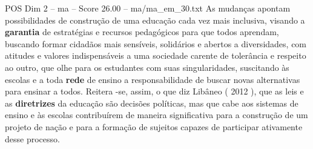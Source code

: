 \begin{textsample}{POS Dim 2 – ma – Score 26.00 – ma/ma\_em\_30.txt}
As mudanças apontam possibilidades de construção de uma educação cada vez mais inclusiva, visando a \textbf{garantia} de estratégias e recursos pedagógicos para que todos aprendam, buscando formar cidadãos mais sensíveis, solidários e abertos a diversidades, com atitudes e valores indispensáveis a uma sociedade carente de tolerância e respeito ao outro, que olhe para os estudantes com suas singularidades, suscitando às escolas e a toda \textbf{rede} de ensino a responsabilidade de buscar novas alternativas para ensinar a todos.
Reitera -se, assim, o que diz Libâneo ( 2012 ), que as leis e as \textbf{diretrizes} da educação são decisões políticas, mas que cabe aos sistemas de ensino e às escolas contribuírem de maneira significativa para a construção de um projeto de nação e para a formação de sujeitos capazes de participar ativamente desse processo.

\end{textsample}
